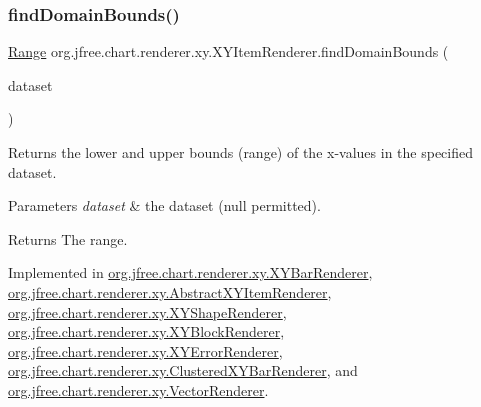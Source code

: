 \subsubsection{\texorpdfstring{find\+Domain\+Bounds()}{findDomainBounds()}}
{\footnotesize\ttfamily \mbox{\hyperlink{classorg_1_1jfree_1_1data_1_1_range}{Range}} org.\+jfree.\+chart.\+renderer.\+xy.\+X\+Y\+Item\+Renderer.\+find\+Domain\+Bounds (\begin{DoxyParamCaption}\item[{\mbox{\hyperlink{interfaceorg_1_1jfree_1_1data_1_1xy_1_1_x_y_dataset}{X\+Y\+Dataset}}}]{dataset }\end{DoxyParamCaption})}

Returns the lower and upper bounds (range) of the x-\/values in the specified dataset.


\begin{DoxyParams}{Parameters}
{\em dataset} & the dataset ({\ttfamily null} permitted).\\
\hline
\end{DoxyParams}
\begin{DoxyReturn}{Returns}
The range. 
\end{DoxyReturn}


Implemented in \mbox{\hyperlink{classorg_1_1jfree_1_1chart_1_1renderer_1_1xy_1_1_x_y_bar_renderer_a28042e2cf765d8fd827b924d06ba5143}{org.\+jfree.\+chart.\+renderer.\+xy.\+X\+Y\+Bar\+Renderer}}, \mbox{\hyperlink{classorg_1_1jfree_1_1chart_1_1renderer_1_1xy_1_1_abstract_x_y_item_renderer_aa663388be3250653a6883e5c1fb4da7e}{org.\+jfree.\+chart.\+renderer.\+xy.\+Abstract\+X\+Y\+Item\+Renderer}}, \mbox{\hyperlink{classorg_1_1jfree_1_1chart_1_1renderer_1_1xy_1_1_x_y_shape_renderer_a84f6e58c06ea03d5084f82935f277fca}{org.\+jfree.\+chart.\+renderer.\+xy.\+X\+Y\+Shape\+Renderer}}, \mbox{\hyperlink{classorg_1_1jfree_1_1chart_1_1renderer_1_1xy_1_1_x_y_block_renderer_a06dee596697cffdf1e23acb81a2ecd5e}{org.\+jfree.\+chart.\+renderer.\+xy.\+X\+Y\+Block\+Renderer}}, \mbox{\hyperlink{classorg_1_1jfree_1_1chart_1_1renderer_1_1xy_1_1_x_y_error_renderer_a9776b39a3a9dc9ede952ec6044e7975f}{org.\+jfree.\+chart.\+renderer.\+xy.\+X\+Y\+Error\+Renderer}}, \mbox{\hyperlink{classorg_1_1jfree_1_1chart_1_1renderer_1_1xy_1_1_clustered_x_y_bar_renderer_a47251aac68f79159a1c5206e79d17341}{org.\+jfree.\+chart.\+renderer.\+xy.\+Clustered\+X\+Y\+Bar\+Renderer}}, and \mbox{\hyperlink{classorg_1_1jfree_1_1chart_1_1renderer_1_1xy_1_1_vector_renderer_a05a8f9e4032e5aff9947ecb614ebfe82}{org.\+jfree.\+chart.\+renderer.\+xy.\+Vector\+Renderer}}.

